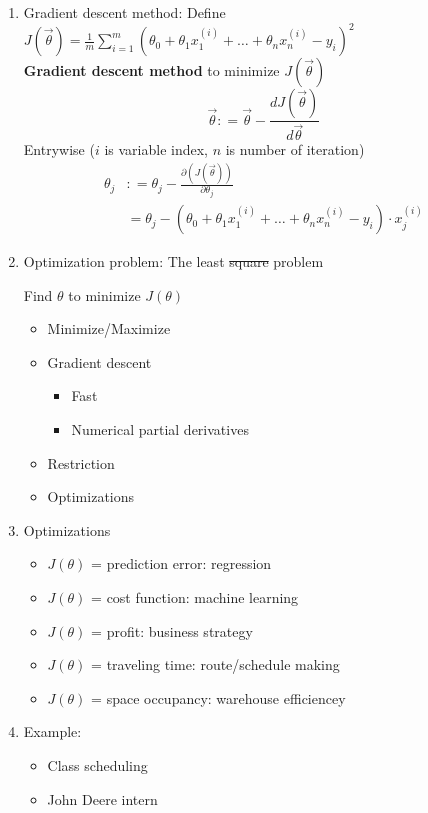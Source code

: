 \documentclass{article}
\theoremstyle{remark}
\begin{document}
\begin{enumerate}
\item Gradient descent method: Define $\displaystyle J(\vec \theta) = \frac{1}{m}\sum_{i=1}^m(\theta_0+ \theta_1x^{(i)}_1+\dots+ \theta_nx^{(i)}_n -y_i)^2$\\[0.2in]

{\bf Gradient descent method} to minimize $J(\vec \theta)$
$$
\vec \theta : = \vec\theta - \frac{dJ(\vec \theta)}{d\vec\theta}
$$
Entrywise ($i$ is variable index, $n$ is number of iteration)
\begin{equation*}
\begin{split}
\theta_{j} &: = \theta_j - \frac{\partial(J(\vec\theta))}{\partial \theta_j}\\
& = \theta_j - (\theta_0+ \theta_1x^{(i)}_1+\dots+ \theta_nx^{(i)}_n -y_i)\cdot x^{(i)}_j
\end{split}
\end{equation*}

\item Optimization problem: The least \st{square} problem
\begin{center}
Find $\theta$ to minimize $J(\theta)$
\end{center}
\begin{itemize}
\item Minimize/Maximize
\item Gradient descent
\begin{itemize}
\item Fast
\item Numerical partial derivatives
\end{itemize}
\item Restriction
\item Optimizations
\end{itemize}

\item Optimizations
\begin{itemize}
\item $J(\theta)$ = prediction error: regression
\item $J(\theta)$ = cost function: machine learning
\item $J(\theta)$ = profit: business strategy
\item  $J(\theta)$ = traveling time: route/schedule making
\item $J(\theta)$ = space occupancy: warehouse efficiencey
\end{itemize}


\item Example:
\begin{itemize}
\item Class scheduling
\item John Deere intern
\end{itemize}
\end{enumerate}
\end{document}
